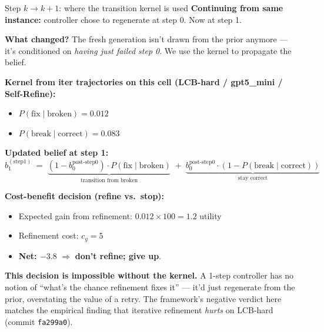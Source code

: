 \documentclass[10pt]{beamer}
\newcommand{\bad}[1]{\textcolor{accentRed}{\textbf{#1}}}
\newcommand{\warn}[1]{\textcolor{accentOrange}{\textbf{#1}}}
\newcommand{\info}[1]{\textcolor{primaryBlue}{\textbf{#1}}}
\begin{document}
\begin{frame}{Step $k \to k{+}1$: where the transition kernel is used}
\vspace{0.1cm}
\info{Continuing from same instance:} controller chose to regenerate at step 0.
Now at step 1.

\textbf{What changed?} The fresh generation isn't drawn from the prior anymore
--- it's conditioned on \emph{having just failed step 0}. We use the kernel
to propagate the belief.

\textbf{Kernel from iter trajectories on this cell (LCB-hard / gpt5\_mini / Self-Refine):}
\begin{itemize}
\item $P(\text{fix} \mid \text{broken}) = 0.012$
\item $P(\text{break} \mid \text{correct}) = 0.083$
\end{itemize}

\textbf{Updated belief at step 1:}
\[
b_1^{(\text{step}1)} \;=\;
\underbrace{(1 - b_0^{\text{post-step0}}) \cdot P(\text{fix}\mid\text{broken})}_{\text{transition from broken}}
\;+\; \underbrace{b_0^{\text{post-step0}} \cdot (1 - P(\text{break}\mid\text{correct}))}_{\text{stay correct}}
\]

\textbf{Cost-benefit decision (refine vs.\ stop):}
\begin{itemize}
\item Expected gain from refinement: $0.012 \times 100 = 1.2$ utility
\item Refinement cost: $c_g = 5$
\item \bad{Net: $-3.8$} $\Rightarrow$ \warn{don't refine; give up}.
\end{itemize}

\info{This decision is impossible without the kernel.} A 1-step controller has
no notion of ``what's the chance refinement fixes it'' --- it'd just regenerate
from the prior, overstating the value of a retry. The framework's negative
verdict here matches the empirical finding that iterative refinement
\emph{hurts} on LCB-hard (commit \texttt{fa299a0}).
\end{frame}
\end{document}
